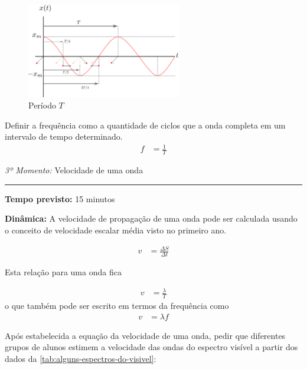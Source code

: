     \vspace*{20pt}
    \begin{figure}[!ht]
        \centering
        \includegraphics[width=0.6\textwidth]{img/periodo-1.png}
        \caption{Período $T$}
        \label{fig:periodo-de-onda}
    \end{figure}
    \vspace*{20pt}

    Definir a frequência como a quantidade de ciclos que a onda completa em um intervalo de tempo determinado.
    \begin{align}
        f&=\frac{1}{T}
    \end{align}

    \vspace*{20pt}
    \noindent \emph{3º Momento:} Velocidade de uma onda
    \par\noindent\rule{.3\textwidth}{.5pt}  
    \par\noindent \textbf{Tempo previsto:} 15 minutos

    \noindent \textbf{Dinâmica:} A velocidade de propagação de uma onda pode ser calculada usando o conceito de velocidade escalar média visto no primeiro ano.

    \begin{align}
        v&=\frac{\Delta S}{\Delta t}
    \end{align}

    Esta relação para uma onda fica

    \begin{align}
        v&=\frac{\lambda}{T}
    \end{align}
    o que também pode ser escrito em termos da frequência como
    \begin{align}
        v&=\lambda f
    \end{align}

    Após estabelecida a equação da velocidade de uma onda, pedir que diferentes grupos de alunos estimem a velocidade das ondas do espectro visível a partir dos dados da \autoref{tab:alguns-espectros-do-visivel}:
    \vspace*{1pt}
    
